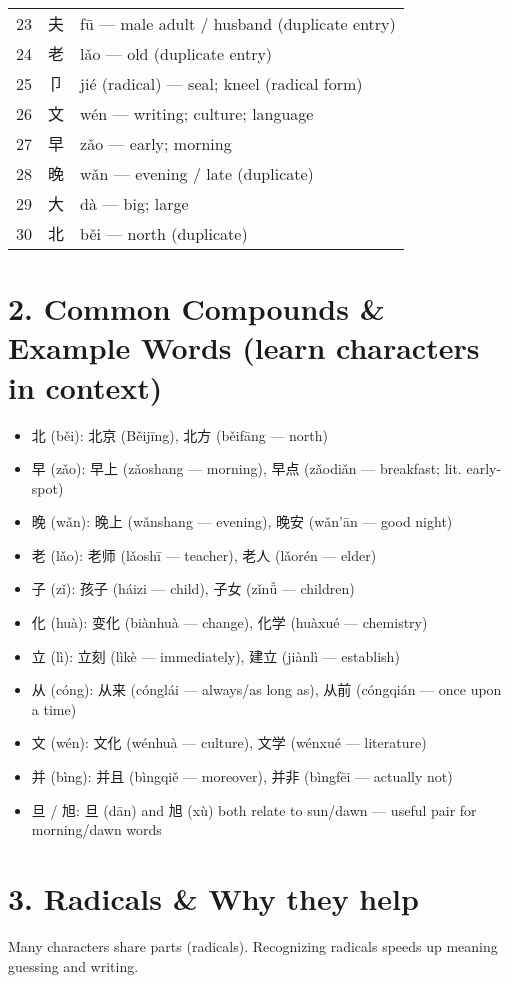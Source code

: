 \begin{CJK}{UTF8}{gbsn}
\begin{longtable}{lll}
23 & 夫 & fū — male adult / husband (duplicate entry) \\
24 & 老 & lǎo — old (duplicate entry) \\
25 & 卩 & jié (radical) — seal; kneel (radical form) \\
26 & 文 & wén — writing; culture; language \\
27 & 早 & zǎo — early; morning \\
28 & 晚 & wǎn — evening / late (duplicate) \\
29 & 大 & dà — big; large \\
30 & 北 & běi — north (duplicate) \\
\bottomrule
\end{longtable}

\section*{2. Common Compounds \& Example Words (learn characters in context)}
\begin{itemize}
  \item 北 (běi): 北京 (Běijīng), 北方 (běifāng — north)
  \item 早 (zǎo): 早上 (zǎoshang — morning), 早点 (zǎodiǎn — breakfast; lit. early-spot)
  \item 晚 (wǎn): 晚上 (wǎnshang — evening), 晚安 (wǎn'ān — good night)
  \item 老 (lǎo): 老师 (lǎoshī — teacher), 老人 (lǎorén — elder)
  \item 子 (zǐ): 孩子 (háizi — child), 子女 (zǐnǚ — children)
  \item 化 (huà): 变化 (biànhuà — change), 化学 (huàxué — chemistry)
  \item 立 (lì): 立刻 (lìkè — immediately), 建立 (jiànlì — establish)
  \item 从 (cóng): 从来 (cónglái — always/as long as), 从前 (cóngqián — once upon a time)
  \item 文 (wén): 文化 (wénhuà — culture), 文学 (wénxué — literature)
  \item 并 (bìng): 并且 (bìngqiě — moreover), 并非 (bìngfēi — actually not)
  \item 旦 / 旭: 旦 (dān) and 旭 (xù) both relate to sun/dawn — useful pair for morning/dawn words
\end{itemize}

\section*{3. Radicals \& Why they help}
Many characters share parts (radicals). Recognizing radicals speeds up meaning guessing and writing.


\end{CJK}

